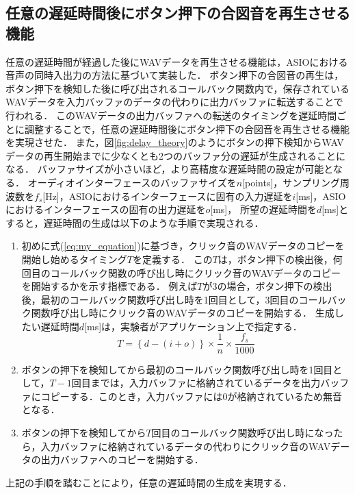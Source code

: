 \subsection{任意の遅延時間後にボタン押下の合図音を再生させる機能}
任意の遅延時間が経過した後にWAVデータを再生させる機能は，ASIOにおける音声の同時入出力の方法に基づいて実装した．
ボタン押下の合図音の再生は，ボタン押下を検知した後に呼び出されるコールバック関数内で，保存されているWAVデータを入力バッファのデータの代わりに出力バッファに転送することで行われる．
このWAVデータの出力バッファへの転送のタイミングを遅延時間ごとに調整することで，任意の遅延時間後にボタン押下の合図音を再生させる機能を実現させた．
また，図\ref{fig:delay_theory}のようにボタンの押下検知からWAVデータの再生開始までに少なくとも2つのバッファ分の遅延が生成されることになる．
バッファサイズが小さいほど，より高精度な遅延時間の設定が可能となる．
オーディオインターフェースのバッファサイズを$n$[points]，サンプリング周波数を$f_{s}$[Hz]，ASIOにおけるインターフェースに固有の入力遅延を$i$[ms]，ASIOにおけるインターフェースの固有の出力遅延を$o$[ms]，
所望の遅延時間を$d$[ms]とすると，遅延時間の生成は以下のような手順で実現される．
\begin{enumerate}[leftmargin=*]
  \item 初めに式(\ref{eq:my_equation})に基づき，クリック音のWAVデータのコピーを開始し始めるタイミング$T$を定義する．
  この$T$は，ボタン押下の検出後，何回目のコールバック関数の呼び出し時にクリック音のWAVデータのコピーを開始するかを示す指標である．
  例えば$T$が3の場合，ボタン押下の検出後，最初のコールバック関数呼び出し時を1回目として，3回目のコールバック関数呼び出し時にクリック音のWAVデータのコピーを開始する．
  生成したい遅延時間$d$[ms]は，実験者がアプリケーション上で指定する．
\begin{equation}
T = \left\{ d - (i + o) \right\} \times \frac{1}{n} \times  \frac{f_s}{1000} \label{eq:my_equation}
\end{equation}
  \item ボタンの押下を検知してから最初のコールバック関数呼び出し時を1回目として，$T-1$回目までは，入力バッファに格納されているデータを出力バッファにコピーする．このとき，入力バッファには0が格納されているため無音となる．
  \item ボタンの押下を検知してから$T$回目のコールバック関数呼び出し時になったら，入力バッファに格納されているデータの代わりにクリック音のWAVデータの出力バッファへのコピーを開始する．
\end{enumerate}
上記の手順を踏むことにより，任意の遅延時間の生成を実現する．
